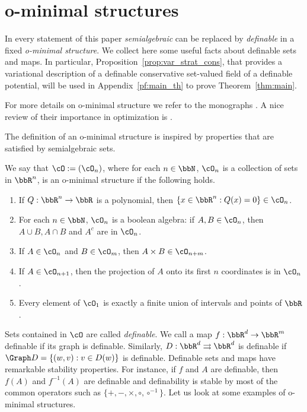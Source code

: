 \appendix

\newpage

\section{o-minimal structures}\label{app:omin}

In every statement of this paper \emph{semialgebraic} can be replaced by \emph{definable} in a fixed \emph{o-minimal structure}. We collect here some useful facts about definable sets and maps. In particular, Proposition~\ref{prop:var_strat_cons}, that provides a variational description of a definable conservative set-valued field of a definable potential, will be used in Appendix~\ref{pf:main_th} to prove Theorem~\ref{thm:main}.

For more details on o-minimal structure we refer to the monographs \cite{cos02,van1998tame,van96}. A nice review of their importance in optimization is \cite{iof08}.

The definition of an o-minimal structure is inspired by properties that are satisfied by semialgebraic sets.
\begin{definition}
  We say that $\cO:=(\cO_n)$, where for each $n \in \bbN$, $\cO_n$ is a collection of sets in $\bbR^n$, is an o-minimal structure if the following holds. 
  \begin{enumerate}[label=\roman*)]
    \item If $Q: \bbR^n \rightarrow \bbR$ is a polynomial, then $\{x \in \bbR^n : Q(x) = 0 \} \in \cO_n$.
    \item For each $n \in \bbN$, $\cO_n$ is a boolean algebra: if $A, B \in \cO_n$, then $A \cup B, A \cap B$ and $A^c$ are in $\cO_n$.
    \item If $A \in \cO_n$ and $B \in \cO_m$, then $A \times B \in \cO_{n+m}$.
    \item If $A \in \cO_{n+1}$, then the projection of $A$ onto its first $n$ coordinates is in $\cO_n$.
    \item Every element of $\cO_1$ is exactly a finite union of intervals and points of $\bbR$. 
  \end{enumerate}
\end{definition}



Sets contained in $\cO$ are called \emph{definable}. We call a map
$f : \bbR^d \rightarrow \bbR^m$ definable if its graph is definable. Similarly, $D: \bbR^d \rightrightarrows \bbR^d$ is definable if $\Graph D = \{(w,v): v \in D(w) \}$ is definable.
Definable sets and maps have remarkable stability
properties. For instance, if $f$ and $A$ are definable, then $f(A)$
and $f^{-1}(A)$ are definable and definability is stable by most of the common operators such as  $\{+, -, \times, \circ, \circ^{-1}\}$. Let us look at some examples of o-minimal structures.

